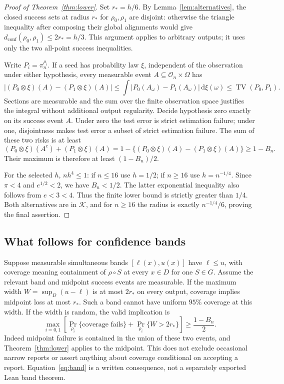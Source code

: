 \documentclass[11pt]{article}
\theoremstyle{remark}
\newcommand{\K}{\mathcal K}
\newcommand{\TV}{\operatorname{TV}}
\newcommand{\dc}{d_{\mathrm{conf}}}
\newcommand{\dd}{\,\mathrm d}
\begin{document}
\begin{proof}[Proof of Theorem~\ref{thm:lower}]
Set $r_*=h/6$. By Lemma~\ref{lem:alternatives}, the closed success
sets at radius $r_*$ for $\rho_0,\rho_1$ are disjoint:
otherwise the triangle inequality after composing their global
alignments would give $\dc(\rho_0,\rho_1)\le2r_*=h/3$.
This argument applies to arbitrary outputs; it uses only the two
all-point success inequalities.

Write $P_i=\pi_n^{\rho_i}$. If a seed has probability law $\xi$,
independent of the observation under either hypothesis, every
measurable event $A\subseteq\mathcal O_n\times\Omega$ has
\[
 |(P_0\otimes\xi)(A)-(P_1\otimes\xi)(A)|
 \le\int |P_0(A_\omega)-P_1(A_\omega)|\dd\xi(\omega)
 \le\TV(P_0,P_1).
\]
Sections are measurable and the sum over the finite observation
space justifies the integral without additional output regularity.
Decide hypothesis zero exactly on its success event $A$.
Under zero the test error is strict estimation failure; under one,
disjointness makes test error a subset of strict estimation failure.
The sum of these two risks is at least
\[
 (P_0\otimes\xi)(A^c)+(P_1\otimes\xi)(A)
 =1-\{(P_0\otimes\xi)(A)-(P_1\otimes\xi)(A)\}
 \ge1-B_n.
\]
Their maximum is therefore at least $(1-B_n)/2$.

For the selected $h$, $nh^4\le1$: if $n\le16$ use $h=1/2$;
if $n\ge16$ use $h=n^{-1/4}$. Since $\pi<4$ and
$e^{1/2}<2$, we have $B_n<1/2$. The latter exponential inequality
also follows from $e<3<4$. Thus the finite lower bound is strictly
greater than $1/4$. Both alternatives are in $\K$, and for $n\ge16$
the radius is exactly $n^{-1/4}/6$, proving the final assertion.
\end{proof}

\subsection{What follows for confidence bands}
Suppose measurable simultaneous bands $[\ell(x),u(x)]$ have
$\ell\le u$, with coverage meaning containment of $\rho\circ S$ at
every $x\in D$ for one $S\in G$. Assume the relevant band and midpoint
success events are measurable. If the maximum width
$W=\sup_D(u-\ell)$ is at most $2r_*$ on every output, coverage implies
midpoint loss at most $r_*$. Such a band cannot have uniform $95\%$
coverage at this width. If the width is random, the valid implication is
\begin{equation}\label{eq:band}
 \max_{i=0,1}\left[
 \Pr_{\rho_i}\{\text{coverage fails}\}
 +\Pr_{\rho_i}\{W>2r_*\}\right]\ge\frac{1-B_n}{2}.
\end{equation}
Indeed midpoint failure is contained in the union of these two
events, and Theorem~\ref{thm:lower} applies to the midpoint.
This does not exclude occasional narrow reports or assert anything
about coverage conditional on accepting a report. Equation~\eqref{eq:band}
is a written consequence, not a separately exported Lean band theorem.
\end{document}
